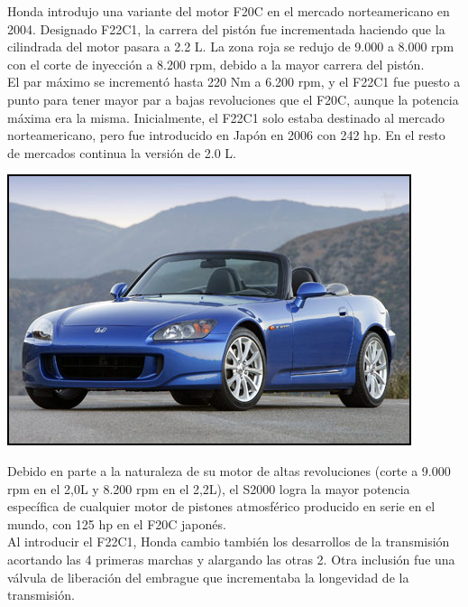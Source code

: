 \documentclass[10pt,a4paper]{report}
\begin{document}
Honda introdujo una variante del motor F20C en el mercado norteamericano en 2004. Designado F22C1, la carrera del pistón fue incrementada haciendo que la cilindrada del motor pasara a 2.2 L. La zona roja se redujo de 9.000 a 8.000 rpm con el corte de inyección a 8.200 rpm, debido a la mayor carrera del pistón.\\ El par máximo se incrementó hasta 220 Nm a 6.200 rpm, y el F22C1 fue puesto a punto para tener mayor par a bajas revoluciones que el F20C, aunque la potencia máxima era la misma. Inicialmente, el F22C1 solo estaba destinado al mercado norteamericano, pero fue introducido en Japón en 2006 con 242 hp. En el resto de mercados continua la versión de 2.0 L.
\begin{center}
    \includegraphics[scale=.65]{s2000.jpg}
\end{center}
Debido en parte a la naturaleza de su motor de altas revoluciones (corte a 9.000 rpm en el 2,0L y 8.200 rpm en el 2,2L), el S2000 logra la mayor potencia específica de cualquier motor de pistones atmosférico producido en serie en el mundo, con 125 hp en el F20C japonés.
\\

Al introducir el F22C1, Honda cambio también los desarrollos de la transmisión acortando las 4 primeras marchas y alargando las otras 2. Otra inclusión fue una válvula de liberación del embrague que incrementaba la longevidad de la transmisión.\\



\end{document}
